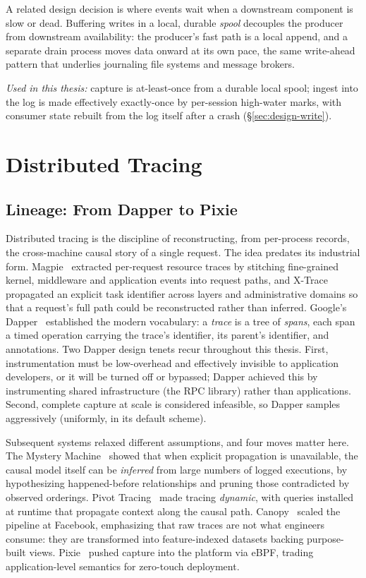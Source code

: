 A related design decision is where events wait when a downstream component is
slow or dead. Buffering writes in a local, durable \emph{spool} decouples the
producer from downstream availability: the producer's fast path is a local
append, and a separate drain process moves data onward at its own pace,
the same write-ahead pattern that underlies journaling file systems and
message brokers.

\emph{Used in this thesis:} capture is at-least-once from a durable local
spool; ingest into the log is made effectively exactly-once by per-session
high-water marks, with consumer state rebuilt from the log itself after a
crash (\S\ref{sec:design-write}).

\section{Distributed Tracing}
\label{sec:bg-tracing}

\subsection{Lineage: From Dapper to Pixie}
\label{sec:bg-tracing-lineage}

Distributed tracing is the discipline of reconstructing, from per-process
records, the cross-machine causal story of a single request. The idea
predates its industrial form. Magpie~\cite{barham2004magpie} extracted
per-request resource traces by stitching fine-grained kernel, middleware
and application events into request paths, and
X-Trace~\cite{fonseca2007xtrace} propagated an explicit task identifier
across layers and administrative domains so that a request's full path
could be reconstructed rather than inferred. Google's
Dapper~\cite{sigelman2010dapper} established the modern vocabulary: a
\emph{trace} is a tree of \emph{spans}, each span a timed operation carrying
the trace's identifier, its parent's identifier, and annotations. Two Dapper
design tenets recur throughout this thesis. First, instrumentation must be
low-overhead and effectively invisible to application developers, or it will
be turned off or bypassed; Dapper achieved this by instrumenting shared
infrastructure (the RPC library) rather than applications. Second, complete
capture at scale is considered infeasible, so Dapper samples aggressively
(uniformly, in its default scheme).

Subsequent systems relaxed different assumptions, and four moves matter
here. The Mystery Machine~\cite{chow2014mystery} showed that when explicit
propagation is unavailable, the causal model itself can be \emph{inferred}
from large numbers of logged executions, by hypothesizing happened-before
relationships and pruning those contradicted by observed orderings. Pivot
Tracing~\cite{mace2015pivot} made tracing \emph{dynamic}, with queries
installed at runtime that propagate context along the causal path.
Canopy~\cite{kaldor2017canopy} scaled the pipeline at Facebook, emphasizing
that raw traces are not what engineers consume: they are transformed into
feature-indexed datasets backing purpose-built views. Pixie~\cite{pixie}
pushed capture into the platform via eBPF, trading application-level
semantics for zero-touch deployment.

